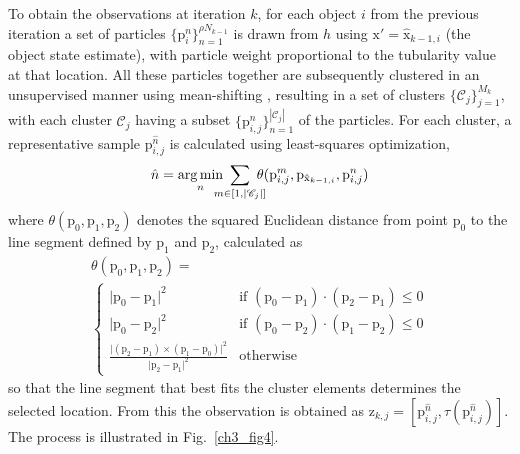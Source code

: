 To obtain the observations at iteration $k$, for each object $i$ from the previous iteration a set of particles $\{\mathrm{p}_{i}^{n}\}_{n=1}^{\rho N_{k-1}}$ is drawn from $h$ using $\mathrm{x'}=\hat{\mathrm{x}}_{k-1,i}$ (the object state estimate), with particle weight proportional to the tubularity value at that location. All these particles together are subsequently clustered in an unsupervised manner using mean-shifting \cite{cheng1995mean}, resulting in a set of clusters $\lbrace \mathscr{C}_j \rbrace_{j=1}^{M_k}$, with each cluster $\mathscr{C}_j$ having a subset $\lbrace\mathrm{p}_{i,j}^n\rbrace_{n=1}^{|\mathscr{C}_j|}$ of the particles. For each cluster, a representative sample $\mathrm{p}_{i,j}^{\hat{n}}$ is calculated using least-squares optimization,
\begin{equation}
\label{eq:n-measure} %
\hat{n} = \argmin_n \!\!\!\!\!\sum\limits_{m \in \left[ 1, |\mathscr{C}_j| \right]}\!\!\!\!\! \theta(\mathrm{p}_{i,j}^m, \mathrm{p}_{\hat{\mathrm{x}}_{k-1,i}}, \mathrm{p}_{i,j}^n)
\end{equation}
where $\theta(\mathrm{p}_0, \mathrm{p}_1, \mathrm{p}_2)$ denotes the squared Euclidean distance from point $\mathrm{p}_0$ to the line segment defined by $\mathrm{p}_1$ and $\mathrm{p}_2$, calculated as
\begin{multline}
\label{eq:theta}
\theta(\mathrm{p}_0, \mathrm{p}_1, \mathrm{p}_2) = \\
\begin{cases}
\vert \mathrm{p}_0 - \mathrm{p}_1 \vert^2 & \textrm{if\ } (\mathrm{p}_0-\mathrm{p}_1) \cdot (\mathrm{p}_2-\mathrm{p}_1) \leq 0 \\
\vert \mathrm{p}_0 - \mathrm{p}_2 \vert^2 & \textrm{if\ } (\mathrm{p}_0-\mathrm{p}_2) \cdot (\mathrm{p}_1-\mathrm{p}_2) \leq 0 \\
\frac{\vert(\mathrm{p}_2-\mathrm{p}_1) \times (\mathrm{p}_1-\mathrm{p}_0)\vert^2}{\vert\mathrm{p}_2-\mathrm{p}_1\vert^2} & \textrm{otherwise}
\end{cases}
\end{multline}
so that the line segment that best fits the cluster elements determines the selected location. From this the observation is obtained as $\mathrm{z}_{k,j} = [\mathrm{p}_{i,j}^{\hat{n}}, \tau(\mathrm{p}_{i,j}^{\hat{n}})]$. The process is illustrated in Fig.~\ref{ch3_fig4}.
